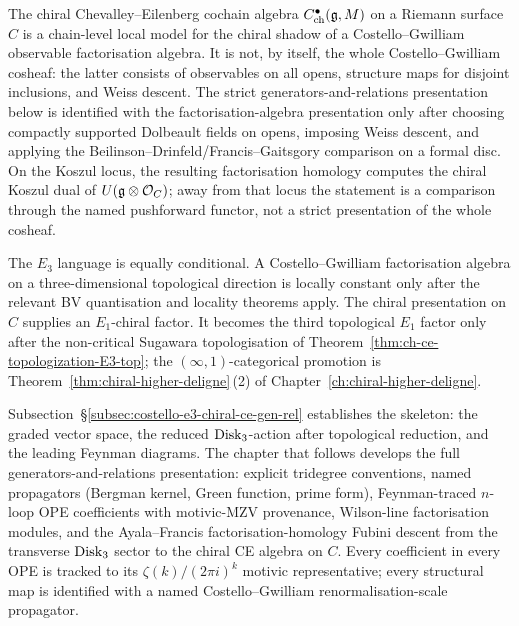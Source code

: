 The chiral Chevalley--Eilenberg cochain algebra
$C^\bullet_{\mathrm{ch}}(\mathfrak{g},M)$ on a Riemann surface $C$ is a
chain-level local model for the chiral shadow of a
Costello--Gwilliam observable factorisation algebra. It is not, by
itself, the whole Costello--Gwilliam cosheaf: the latter consists of
observables on all opens, structure maps for disjoint inclusions, and
Weiss descent. The strict generators-and-relations presentation below
is identified with the factorisation-algebra presentation only after
choosing compactly supported Dolbeault fields on opens, imposing Weiss
descent, and applying the Beilinson--Drinfeld/Francis--Gaitsgory
comparison on a formal disc. On the Koszul locus, the resulting
factorisation homology computes the chiral Koszul dual of
$U(\mathfrak{g}\otimes\mathcal{O}_C)$; away from that locus the statement is a
comparison through the named pushforward functor, not a strict
presentation of the whole cosheaf.

The $E_3$ language is equally conditional. A Costello--Gwilliam
factorisation algebra on a three-dimensional topological direction is
locally constant only after the relevant BV quantisation and locality
theorems apply. The chiral presentation on $C$ supplies an
$E_1$-chiral factor. It becomes the third topological $E_1$ factor only
after the non-critical Sugawara topologisation of
Theorem~\ref{thm:ch-ce-topologization-E3-top}; the
$(\infty,1)$-categorical promotion is
Theorem~\ref{thm:chiral-higher-deligne}\,(2) of
Chapter~\ref{ch:chiral-higher-deligne}.

Subsection~\S\ref{subsec:costello-e3-chiral-ce-gen-rel}
establishes the skeleton: the
graded vector space, the reduced $\mathrm{Disk}_3$-action after topological
reduction, and the leading Feynman diagrams. The chapter that follows
develops the full generators-and-relations presentation: explicit tridegree conventions,
named propagators (Bergman kernel, Green function, prime form),
Feynman-traced $n$-loop OPE coefficients with motivic-MZV provenance,
Wilson-line factorisation modules, and the Ayala--Francis
factorisation-homology Fubini descent from the transverse $\mathrm{Disk}_3$
sector to the chiral CE algebra on $C$. Every coefficient in every OPE is tracked to its
$\zeta(k)/(2\pi i)^k$ motivic representative; every structural map is
identified with a named Costello--Gwilliam renormalisation-scale
propagator.

